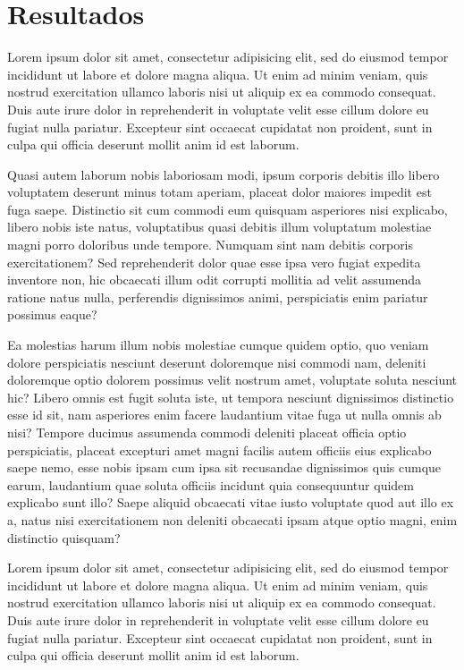 \documentclass[
    12pt,               %
    openright,          %
    twoside,            %
    a4paper,            %
    chapter=TITLE,     %
    english,            %
    spanish,            %
    portuguese              %
    ]{abntex2}
\begin{document}
\chapter{Resultados}

Lorem ipsum dolor sit amet, consectetur adipisicing elit, sed do eiusmod tempor incididunt ut labore et dolore magna aliqua. Ut enim ad minim veniam, quis nostrud exercitation ullamco laboris nisi ut aliquip ex ea commodo consequat. Duis aute irure dolor in reprehenderit in voluptate velit esse cillum dolore eu fugiat nulla pariatur. Excepteur sint occaecat cupidatat non proident, sunt in culpa qui officia deserunt mollit anim id est laborum.


Quasi autem laborum nobis laboriosam modi, ipsum corporis debitis illo libero voluptatem deserunt minus totam aperiam, placeat dolor maiores impedit est fuga saepe. Distinctio sit cum commodi eum quisquam asperiores nisi explicabo, libero nobis iste natus, voluptatibus quasi debitis illum voluptatum molestiae magni porro doloribus unde tempore. Numquam sint nam debitis corporis exercitationem? Sed reprehenderit dolor quae esse ipsa vero fugiat expedita inventore non, hic obcaecati illum odit corrupti mollitia ad velit assumenda ratione natus nulla, perferendis dignissimos animi, perspiciatis enim pariatur possimus eaque?


Ea molestias harum illum nobis molestiae cumque quidem optio, quo veniam dolore perspiciatis nesciunt deserunt doloremque nisi commodi nam, deleniti doloremque optio dolorem possimus velit nostrum amet, voluptate soluta nesciunt hic? Libero omnis est fugit soluta iste, ut tempora nesciunt dignissimos distinctio esse id sit, nam asperiores enim facere laudantium vitae fuga ut nulla omnis ab nisi? Tempore ducimus assumenda commodi deleniti placeat officia optio perspiciatis, placeat excepturi amet magni facilis autem officiis eius explicabo saepe nemo, esse nobis ipsam cum ipsa sit recusandae dignissimos quis cumque earum, laudantium quae soluta officiis incidunt quia consequuntur quidem explicabo sunt illo? Saepe aliquid obcaecati vitae iusto voluptate quod aut illo ex a, natus nisi exercitationem non deleniti obcaecati ipsam atque optio magni, enim distinctio quisquam?

Lorem ipsum dolor sit amet, consectetur adipisicing elit, sed do eiusmod tempor incididunt ut labore et dolore magna aliqua. Ut enim ad minim veniam, quis nostrud exercitation ullamco laboris nisi ut aliquip ex ea commodo consequat. Duis aute irure dolor in reprehenderit in voluptate velit esse cillum dolore eu fugiat nulla pariatur. Excepteur sint occaecat cupidatat non proident, sunt in culpa qui officia deserunt mollit anim id est laborum.
\end{document}

